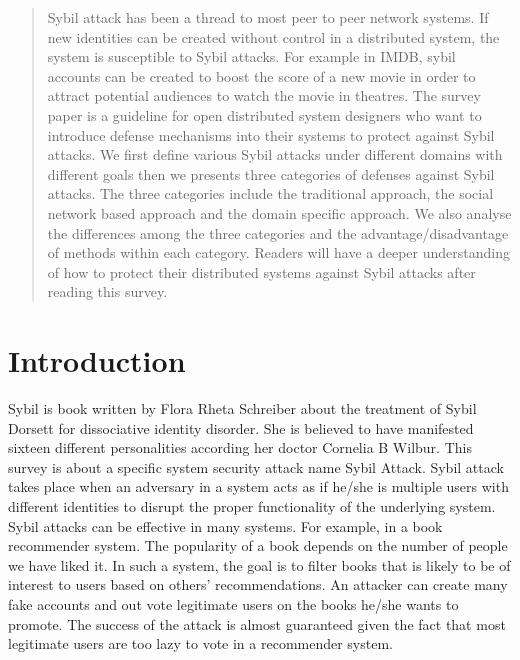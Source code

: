 \documentclass[conference]{IEEEtran}
\begin{document}
\begin{abstract}
Sybil attack has been a thread to most peer to peer network systems. 
If new identities can be created without control in a distributed system, the system is susceptible to Sybil attacks.
For example in IMDB, sybil accounts can be created to boost the score of a new movie in order to attract potential audiences to watch the movie in theatres.
The survey paper is a guideline for open distributed system designers who want to introduce defense mechanisms into their systems to protect against Sybil attacks.
We first define various Sybil attacks under different domains with different goals then we presents three categories of defenses against Sybil attacks.
The three categories include the traditional approach, the social network based approach and the domain specific approach.
We also analyse the differences among the three categories and the advantage/disadvantage of methods within each category. 
Readers will have a deeper understanding of how to protect their distributed systems against Sybil attacks after reading this survey.

\end{abstract}





%
\IEEEpeerreviewmaketitle



\section{Introduction}
Sybil is book written by Flora Rheta Schreiber about the treatment of Sybil Dorsett for dissociative identity disorder. She is believed to have manifested sixteen different
personalities according her doctor Cornelia B Wilbur.\cite{sybil16wiki}
This survey is about a specific system security attack name Sybil Attack. Sybil attack takes place when an adversary in a system acts as if he/she is multiple users
with different identities to disrupt the proper functionality of the underlying system. Sybil attacks can be effective in many systems. For example, in a book recommender system.
The popularity of a book depends on the number of people we have liked it. In such a system, the goal is to filter books that is likely to be of interest to users based on others'
recommendations. An attacker can create many fake accounts and out vote legitimate users on the books he/she wants to promote. The success of the attack is almost guaranteed given
the fact that most legitimate users are too lazy to vote in a recommender system. 
\end{document}
